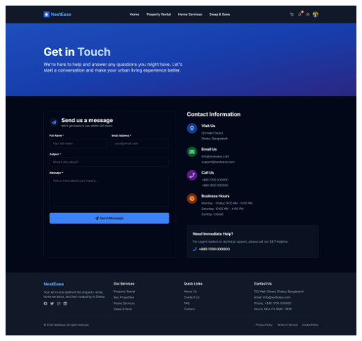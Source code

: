 \documentclass[conference]{IEEEtran}
\begin{document}
\begin{center}
\noindent
\begin{minipage}[t]{0.45\textwidth}
\includegraphics[width=\linewidth]{Project Screenshot/Contact Us.png}
\end{minipage} \hfill
\begin{minipage}[t]{0.45\textwidth}

\end{minipage}
\end{center}
\end{document}
